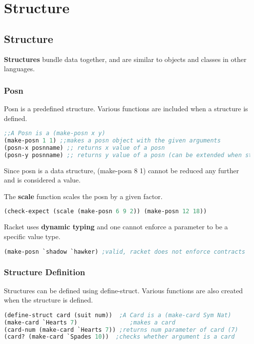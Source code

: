 \documentclass[english, 12pt]{article}
\begin{document}
\section{Structure}
\subsection{Structure}
\begin{defn}
\textbf{Structures} bundle data together, and are similar to objects and classes in other languages.
\end{defn}
\subsubsection*{Posn}
Posn is a predefined structure. Various functions are included when a structure is defined.
\begin{lstlisting}[language=Scheme]
;;A Posn is a (make-posn x y)
(make-posn 1 1) ;;makes a posn object with the given arguments
(posn-x posnname) ;; returns x value of a posn
(posn-y posnname) ;; returns y value of a posn (can be extended when structure has more arguments)
\end{lstlisting}

\begin{note}
Since posn is a data structure, (make-posn 8 1) cannot be reduced any further and is considered a value.
\end{note}
\begin{defn}
The \textbf{scale} function scales the posn by a given factor.
\begin{lstlisting}[language=Scheme]
(check-expect (scale (make-posn 6 9 2)) (make-posn 12 18))
\end{lstlisting}
\end{defn}
\begin{defn}
Racket uses \textbf{dynamic typing} and one cannot enforce a parameter to be a specific value type.
\begin{lstlisting}[language=Scheme]
(make-posn `shadow `hawker) ;valid, racket does not enforce contracts
\end{lstlisting}
\end{defn}
\subsubsection*{Structure Definition}
Structures can be defined using define-struct. Various functions are also created when the structure is defined.
\begin{lstlisting}[language=Scheme]
(define-struct card (suit num))  ;A Card is a (make-card Sym Nat)
(make-card `Hearts 7) 				;makes a card
(card-num (make-card `Hearts 7)) ;returns num parameter of card (7)
(card? (make-card `Spades 10)) 	;checks whether argument is a card
\end{lstlisting}
\end{document}
